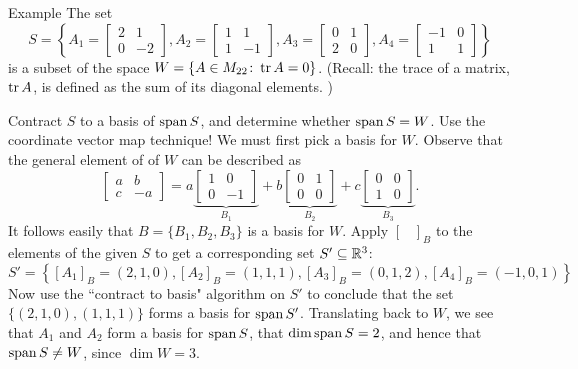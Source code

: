 \begin{frame}{Example}
The set 
\[
S=\left \{ A_1=\begin{bmatrix}
2&1\\
0&-2
\end{bmatrix}, A_2=\begin{bmatrix}
1&1\\
1&-1
\end{bmatrix}, 
A_3=\begin{bmatrix}
0&1\\
2&0
\end{bmatrix},
A_4=\begin{bmatrix}
-1&0\\
1&1
\end{bmatrix}\right\}
\]
is a subset of the space $W=\{ A\in M_{22}\colon \operatorname{tr} A=0\}$. (Recall: the trace of a matrix, $\operatorname{tr} A$, is defined as the sum of its diagonal elements. )

Contract $S$ to a basis of $\operatorname{span} S$, and determine whether $\operatorname{span} S=W$. Use the coordinate vector map technique! 
\bpause 
We must first pick a basis for $W$. Observe that the general element of of $W$ can be described as 
\[
\begin{bmatrix}a&b\\
c&-a\end{bmatrix}
=a\underset{B_1}{\underbrace{\begin{bmatrix}
1&0\\
0&-1
\end{bmatrix}}}+b\underset{B_2}{\underbrace{\begin{bmatrix}
0&1\\
0&0
\end{bmatrix}}}+c\underset{B_3}{\underbrace{\begin{bmatrix}
0&0\\1&0
\end{bmatrix}}}.\]
It follows easily that $B=\{B_1,B_2, B_3\}$ is a basis for $W$. 
\bpause
Apply $[\hspace{10pt}]_B$ to the elements of the given $S$ to get a corresponding set $S'\subseteq{\mathbb R}^3$:
\[
S'=\left\{ [A_1]_B=(2,1,0), [A_2]_B=(1,1,1), [A_3]_B=(0,1,2), [A_4]_B=(-1,0,1)\right\}
\]
\pause
Now use the ``contract to basis" algorithm on $S'$ to conclude that the set $\{(2,1,0), (1,1,1)\}$ forms a basis for $\operatorname{span} S'$. Translating back to $W$, we see that $A_1$ and $A_2$ form a basis for $\operatorname{span} S$, that $\dim\operatorname{span} S=2$, and hence that $\operatorname{span} S\ne W$, since $\dim W=3$. 
\end{frame}
